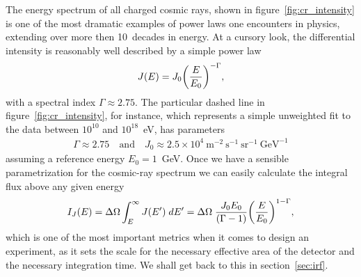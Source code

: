 The energy spectrum of all charged cosmic rays, shown in figure~\ref{fig:cr_intensity}
is one of the most dramatic examples of power laws one encounters in physics,
extending over more then 10~decades in energy. At a cursory look, the differential
intensity is reasonably well described by a simple power law
\begin{align}
  J(E) = J_0 \qty(\frac{E}{E_0})^{-\Gamma},
\end{align}
with a spectral index $\Gamma \approx 2.75$. The particular dashed line in
figure~\ref{fig:cr_intensity}, for instance, which represents a simple unweighted
fit to the data between $10^{10}$ and $10^{18}$~eV, has parameters
\begin{align*}
  \Gamma \approx 2.75 \quad\text{and}\quad
  J_0 \approx 2.5 \times 10^4~\text{m}^{-2}~\text{s}^{-1}~\text{sr}^{-1}~\text{GeV}^{-1}
\end{align*}
assuming a reference energy $E_0 = 1$~GeV. Once we have a sensible parametrization
for the cosmic-ray spectrum we can easily calculate the integral flux above any
given energy
\begin{align}\label{eq:cr_integral_flux}
  I_J(E) = \Delta\Omega \int_E^\infty J(E') \;d{E'} =
  \Delta\Omega \; \frac{J_0 E_0}{(\Gamma - 1)} \qty(\frac{E}{E_0})^{1 - \Gamma},
\end{align}
which is one of the most important metrics when it comes to design an experiment,
as it sets the scale for the necessary effective area of the detector and the
necessary integration time. We shall get back to this in section~\ref{sec:irf}.

\begin{marginfigure}
  
  \caption{Cosmic-ray all-particle integral flux above a given energy. This particular
  power law assumes the parametrization from the best fit in figure~\ref{fig:cr_intensity},
  and a field of view of $\pi$~sr, or  of the sky, corresponding to
  a perfect planar detector.}
  \label{fig:cr_integral_flux}
\end{marginfigure}

